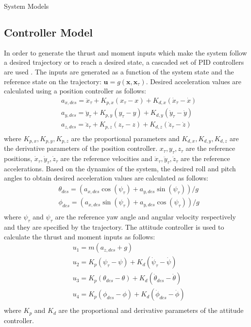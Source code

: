 \begin{section}{System Models}
\subsection{Controller Model}
In order to generate the thrust and moment inputs which make the system follow a desired trajectory or to reach a desired state, a cascaded set of PID controllers are used \cite{KumarRAM2010}. The inputs are generated as a function of the system state and the reference state on the trajectory: $ \boldsymbol{u} = g(\boldsymbol{x}, \boldsymbol{x}_{\tau}) $. Desired acceleration values are calculated using a position controller as follows:
\begin{equation*} 
	\begin{aligned}
		& a_{x,des} = \ddot{x}_{\tau} + K_{p,x} (x_{\tau}-x) + K_{d,x} (\dot{x}_{\tau}-\dot{x}) \\
		& a_{y,des} = \ddot{y}_{\tau} + K_{p,y} (y_{\tau}-y) + K_{d,y} (\dot{y}_{\tau}-\dot{y}) \\
		& a_{z,des} = \ddot{z}_{\tau} + K_{p,z} (z_{\tau}-z) + K_{d,z} (\dot{z}_{\tau}-\dot{z}) \\	
	\end{aligned}		
\end{equation*}
where $ K_{p,x}, K_{p,y}, K_{p,z} $ are the proportional parameters and $ K_{d,x}, K_{d,y}, K_{d,z} $ are the derivative parameters of the position controller. $ x_{\tau}, y_{\tau}, z_{\tau} $ are the reference positions, $ \dot{x}_{\tau}, \dot{y}_{\tau}, \dot{z}_{\tau} $ are the reference velocities and $ \ddot{x}_{\tau}, \ddot{y}_{\tau}, \ddot{z}_{\tau} $ are the reference accelerations. Based on the dynamics of the system, the desired roll and pitch angles to obtain desired acceleration values are calculated as follows:
\begin{equation*}
\begin{aligned}
	& \theta_{des} = (a_{x,des} \cos(\psi_{\tau}) +  a_{y,des} \sin(\psi_{\tau}))/g \\
	& \phi_{des} = (a_{x,des} \sin(\psi_{\tau}) +  a_{y,des} \cos(\psi_{\tau}))/g \\
\end{aligned}
\end{equation*}
where $ \psi_{\tau} $ and $ \psi_{\tau} $ are the reference yaw angle and angular velocity respectively and they are specified by the trajectory. The attitude controller is used to calculate the thrust and moment inputs as follows:
\begin{equation*}
	\begin{aligned}
		& u_1 = m (a_{z,des} + g) \\
		& u_2 = K_p (\psi_{\tau}-\psi) + K_d(\dot{\psi}_{\tau} - \dot{\psi}) \\
		& u_3 = K_p (\theta_{des}-\theta) + K_d(\dot{\theta}_{des} - \dot{\theta}) \\
		& u_4 = K_p (\phi_{des}-\phi) + K_d(\dot{\phi}_{des} - \dot{\phi}) \\
	\end{aligned}		
\end{equation*}
where $ K_p $ and $ K_d $ are the proportional and derivative parameters of the attitude controller.
 

\end{section}
